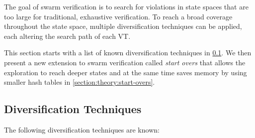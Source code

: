\documentclass[
fancyheadings, %
%
%
]{stsreprt}
\begin{document}
The goal of swarm verification is to search for violations in state spaces that are too large for traditional, exhaustive verification.
To reach a broad coverage throughout the state space, multiple diversification techniques can be applied, each altering the search path of each VT.

This section starts with a list of known diversification techniques in \cref{section:theory:diversification-techniques}.
We then present a new extension to swarm verification called \emph{start overs} that allows the exploration to reach deeper states and at the same time saves memory by using smaller hash tables in \cref{section:theory:start-overs}.


\subsection{Diversification Techniques}
\label{section:theory:diversification-techniques}

The following diversification techniques are known: \cite{Holzmann2011.Swarm-Verification-Techniques,DeFrancisco2020.Grapple}
\end{document}
